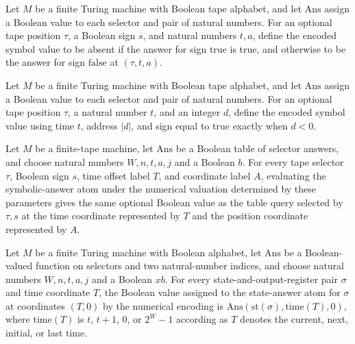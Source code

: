 \begin{definition}
\label{Complexity.Meyer.sv}
\leanok
Let $M$ be a finite Turing machine with Boolean tape alphabet, and let $\mathrm{Ans}$
assign a Boolean value to each selector and pair of natural numbers. For an optional
tape position $\tau$, a Boolean sign $s$, and natural numbers $t,a$, define the encoded
symbol value to be absent if the answer for sign $\mathrm{true}$ is true, and otherwise
to be the answer for sign $\mathrm{false}$ at $(\tau,t,a)$.
\end{definition}

\begin{definition}
\label{Complexity.Meyer.cX}
\leanok
{}
Let $M$ be a finite Turing machine with Boolean tape alphabet, and let $\mathrm{Ans}$
assign a Boolean value to each selector and pair of natural numbers. For an optional
tape position $\tau$, a natural number $t$, and an integer $d$, define the encoded
symbol value using time $t$, address $|d|$, and sign equal to true exactly when $d<0$.
\end{definition}

\begin{theorem}
\label{Complexity.Meyer.symvA_NumVal}
\leanok
{}
Let $M$ be a finite-tape machine, let $\mathrm{Ans}$ be a Boolean table of selector
answers, and choose natural numbers $W,n,t,a,j$ and a Boolean $b$. For every tape
selector $\tau$, Boolean sign $s$, time offset label $T$, and coordinate label $A$,
evaluating the symbolic-answer atom under the numerical valuation determined by these
parameters gives the same optional Boolean value as the table query selected by $\tau,s$
at the time coordinate represented by $T$ and the position coordinate represented by
$A$.
\end{theorem}

\begin{theorem}
\label{Complexity.Meyer.stA_NumVal}
\leanok
{}
Let $M$ be a finite Turing machine with Boolean alphabet, let $\mathrm{Ans}$ be a
Boolean-valued function on selectors and two natural-number indices, and choose natural
numbers $W,n,t,a,j$ and a Boolean $xb$. For every state-and-output-register pair
$\sigma$ and time coordinate $T$, the Boolean value assigned to the state-answer atom
for $\sigma$ at coordinates $(T,0)$ by the numerical encoding is
$\mathrm{Ans}(\mathrm{st}(\sigma),\mathrm{time}(T),0)$, where $\mathrm{time}(T)$ is $t$,
$t+1$, $0$, or $2^W-1$ according as $T$ denotes the current, next, initial, or last
time.
\end{theorem}

